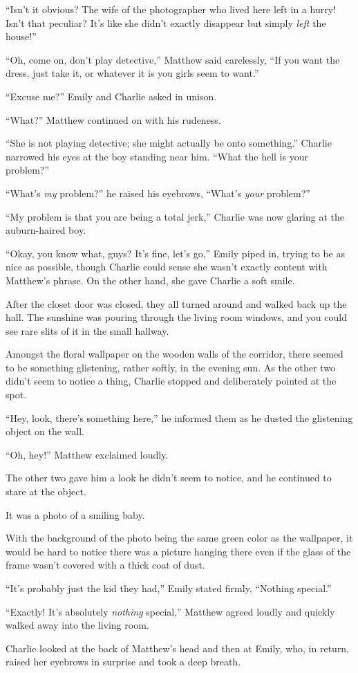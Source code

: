 “Isn't it obvious? The wife of the photographer who lived here left in a hurry! Isn't that peculiar? It's like she didn't exactly disappear but simply \textit{left} the house!”

“Oh, come on, don't play detective,” Matthew said carelessly, “If you want the dress, just take it, or whatever it is you girls seem to want.”

“Excuse me?” Emily and Charlie asked in unison.

“What?” Matthew continued on with his rudeness.

“She is not playing detective; she might actually be onto something.” Charlie narrowed his eyes at the boy standing near him. “What the hell is your problem?”

“What's \textit{my} problem?” he raised his eyebrows, “What's \textit{your} problem?”

“My problem is that you are being a total jerk,” Charlie was now glaring at the auburn-haired boy.

“Okay, you know what, guys? It's fine, let's go,” Emily piped in, trying to be as nice as possible, though Charlie could sense she wasn't exactly content with Matthew's phrase. On the other hand, she gave Charlie a soft smile.

After the closet door was closed, they all turned around and walked back up the hall. The sunshine was pouring through the living room windows, and you could see rare slits of it in the small hallway.

Amongst the floral wallpaper on the wooden walls of the corridor, there seemed to be something glistening, rather softly, in the evening sun. As the other two didn't seem to notice a thing, Charlie stopped and deliberately pointed at the spot.

“Hey, look, there's something here,” he informed them as he dusted the glistening object on the wall.

“Oh, hey!” Matthew exclaimed loudly.

The other two gave him a look he didn't seem to notice, and he continued to stare at the object.

It was a photo of a smiling baby.

With the background of the photo being the same green color as the wallpaper, it would be hard to notice there was a picture hanging there even if the glass of the frame wasn't covered with a thick coat of dust.

“It's probably just the kid they had,” Emily stated firmly, “Nothing special.”

“Exactly! It's absolutely \textit{nothing} special,” Matthew agreed loudly and quickly walked away into the living room.

Charlie looked at the back of Matthew's head and then at Emily, who, in return, raised her eyebrows in surprise and took a deep breath.